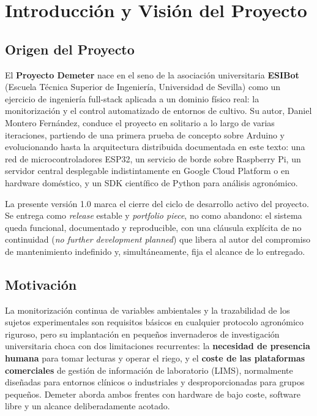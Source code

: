 \chapter*{Introducción y Visión del Proyecto}

\section{Origen del Proyecto}

El \textbf{Proyecto Demeter} nace en el seno de la asociación universitaria
\textbf{ESIBot} (Escuela Técnica Superior de Ingeniería, Universidad de Sevilla)
como un ejercicio de ingeniería full-stack aplicada a un dominio físico real:
la monitorización y el control automatizado de entornos de cultivo. Su autor,
Daniel Montero Fernández, conduce el proyecto en solitario a lo largo de
varias iteraciones, partiendo de una primera prueba de concepto sobre Arduino
y evolucionando hasta la arquitectura distribuida documentada en este texto:
una red de microcontroladores ESP32, un servicio de borde sobre Raspberry Pi,
un servidor central desplegable indistintamente en Google Cloud Platform o en
hardware doméstico, y un SDK científico de Python para análisis agronómico.

La presente versión 1.0 marca el cierre del ciclo de desarrollo activo del
proyecto. Se entrega como \textit{release} estable y \textit{portfolio
piece}, no como abandono: el sistema queda funcional, documentado y
reproducible, con una cláusula explícita de no continuidad (\textit{no further
development planned}) que libera al autor del compromiso de mantenimiento
indefinido y, simultáneamente, fija el alcance de lo entregado.

\section{Motivación}

La monitorización continua de variables ambientales y la trazabilidad de los
sujetos experimentales son requisitos básicos en cualquier protocolo
agronómico riguroso, pero su implantación en pequeños invernaderos de
investigación universitaria choca con dos limitaciones recurrentes: la
\textbf{necesidad de presencia humana} para tomar lecturas y operar el riego,
y el \textbf{coste de las plataformas comerciales} de gestión de información
de laboratorio (LIMS), normalmente diseñadas para entornos clínicos o
industriales y desproporcionadas para grupos pequeños. Demeter aborda ambos
frentes con hardware de bajo coste, software libre y un alcance
deliberadamente acotado.

